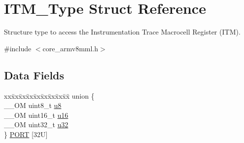 \hypertarget{struct_i_t_m___type}{}\section{I\+T\+M\+\_\+\+Type Struct Reference}
\label{struct_i_t_m___type}


Structure type to access the Instrumentation Trace Macrocell Register (I\+TM).  




{\ttfamily \#include $<$core\+\_\+armv8mml.\+h$>$}

\subsection*{Data Fields}
\begin{DoxyCompactItemize}
\item 
\begin{tabbing}
xx\=xx\=xx\=xx\=xx\=xx\=xx\=xx\=xx\=\kill
union \{\\
\>\_\_OM uint8\_t \hyperlink{struct_i_t_m___type_ae773bf9f9dac64e6c28b14aa39f74275}{u8}\\
\>\_\_OM uint16\_t \hyperlink{struct_i_t_m___type_a962a970dfd286cad7f8a8577e87d4ad3}{u16}\\
\>\_\_OM uint32\_t \hyperlink{struct_i_t_m___type_a5834885903a557674f078f3b71fa8bc8}{u32}\\
\} \hyperlink{struct_i_t_m___type_a7010d53d9f2b725fba177015cbdc6bc2}{PORT} \mbox{[}32U\mbox{]}\\


\end{tabbing}
\end{DoxyCompactItemize}
